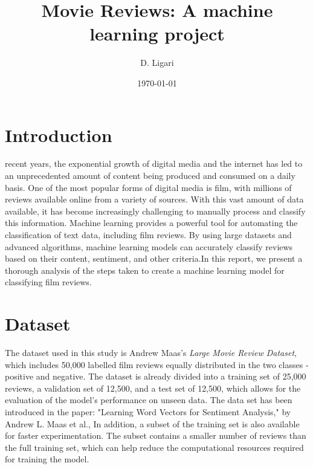 \documentclass[eng]{class}
\title{Movie Reviews: A machine learning project}
\author[1]{D. Ligari}
\affil[1]{University of Pavia, Department of Computer Engineering (Data Science), Pavia, Italy}
\date{\today}
\begin{document}
\maketitle
\thispagestyle{fancy}
\section{Introduction}
recent years, the exponential growth of digital media and the internet has led to an unprecedented amount of content being produced and consumed on a daily basis.
One of the most popular forms of digital media is film, with millions of reviews available online from a variety of sources. With this vast amount of data available,
it has become increasingly challenging to manually process and classify this information.\newline
Machine learning provides a powerful tool for automating the classification of text data, including film reviews.
By using large datasets and advanced algorithms, machine learning models can accurately classify reviews based on their content,
sentiment, and other criteria.\newline In this report, we present a thorough analysis of the steps taken to create a machine learning model for classifying film reviews.
\section{Dataset}
The dataset used in this study is Andrew Maas's \textit{Large Movie Review Dataset},
which includes 50,000 labelled film reviews equally distributed in the two classes - positive and negative.
The dataset is already divided into a training set of 25,000 reviews, a validation set of 12,500, and a test set of 12,500,
which allows for the evaluation of the model's performance on unseen data.
The data set has been introduced in the paper: "Learning Word Vectors for Sentiment Analysis," by Andrew L. Maas et al.,
In addition, a subset of the training set is also available for faster experimentation.
The subset contains a smaller number of reviews than the full training set,
which can help reduce the computational resources required for training the model.
\end{document}
